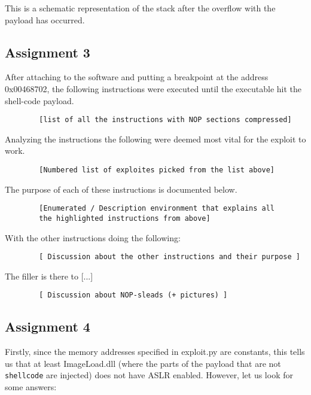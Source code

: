 \documentclass[10pt]{article}
\begin{document}
      This is a schematic representation of the stack after the overflow with
      the payload has occurred.

    \subsection{Assignment 3}

      After attaching to the software and putting a breakpoint at the address
      0x00468702, the following instructions were executed until the executable
      hit the shell-code payload.

      \begin{verbatim}
        [list of all the instructions with NOP sections compressed]
      \end{verbatim}

      Analyzing the instructions the following were deemed most vital for the
      exploit to work.

      \begin{verbatim}
        [Numbered list of exploites picked from the list above]
      \end{verbatim}

      The purpose of each of these instructions is documented below.

      \begin{verbatim}
        [Enumerated / Description environment that explains all
        the highlighted instructions from above]
      \end{verbatim}

      With the other instructions doing the following:

      \begin{verbatim}
        [ Discussion about the other instructions and their purpose ]
      \end{verbatim}

      The filler is there to [...]

      \begin{verbatim}
        [ Discussion about NOP-sleads (+ pictures) ]
      \end{verbatim}


    \subsection{Assignment 4}

Firstly, since the memory addresses specified in exploit.py are constants, this tells us that at least ImageLoad.dll (where the parts of the payload that are not \texttt{shellcode} are injected) does not have ASLR enabled. However, let us look for some answers:
\end{document}
